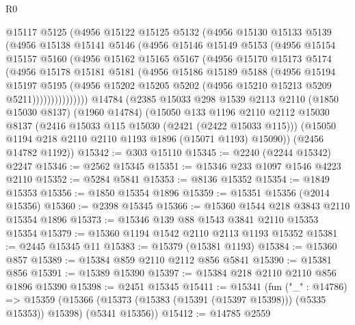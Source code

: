 \begin{lexlean}{R0}
\begin{coremodule}
          @15117
          @5125
          (@4956
            @15122
            @15125
            @5132
            (@4956
              @15130
              @15133
              @5139
              (@4956
                @15138
                @15141
                @5146
                (@4956
                  @15146
                  @15149
                  @5153
                  (@4956
                    @15154
                    @15157
                    @5160
                    (@4956
                      @15162
                      @15165
                      @5167
                      (@4956
                        @15170
                        @15173
                        @5174
                        (@4956
                          @15178
                          @15181
                          @5181
                          (@4956
                            @15186
                            @15189
                            @5188
                            (@4956
                              @15194
                              @15197
                              @5195
                              (@4956
                                @15202
                                @15205
                                @5202
                                (@4956 @15210 @15213 @5209 @5211)))))))))))))))
    @14784
    (@2385
      @15033
      @298
      @1539
      @2113
      @2110
      (@1850 @15030 @8137)
      (@1960 @14784)
      (@15050
        @133
        @1196
        @2110
        @2112
        @15030
        @8137
        (@2416 @15033 @115 @15030 (@2421 (@2422 @15033 @115)))
        (@15050 @1194 @218 @2110 @2110 @1193 @1896 (@15071 @1193) @15090))
      (@2456 @14782 @1192))
@15342 := @303 @15110
@15345 := @2240 (@2244 @15342) @2247
@15346 := @2562 @15345
@15351 := @15346 @233 @1097 @1546 @4223 @2110
@15352 := @5284 @5841
@15353 := @8136 @15352
@15354 := @1849 @15353
@15356 := @1850 @15354 @1896
@15359 := @15351 @15356 (@2014 @15356)
@15360 := @2398 @15345
@15366 := @15360 @1544 @218 @3843 @2110 @15354 @1896
@15373 := @15346 @139 @88 @1543 @3841 @2110 @15353 @15354
@15379 := @15360 @1194 @1542 @2110 @2113 @1193 @15352
@15381 := @2445 @15345 @11
@15383 := @15379 (@15381 @1193)
@15384 := @15360 @857
@15389 := @15384 @859 @2110 @2112 @856 @5841
@15390 := @15381 @856
@15391 := @15389 @15390
@15397 := @15384 @218 @2110 @2110 @856 @1896 @15390
@15398 := @2451 @15345
@15411 := @15341
    (fun ("_" : @14786) =>
    @15359 (@15366 (@15373 (@15383 (@15391 (@15397 @15398))) (@5335 @15353)) @15398) (@5341 @15356))
@15412 := @14785 @2559

\end{coremodule}
\end{lexlean}
